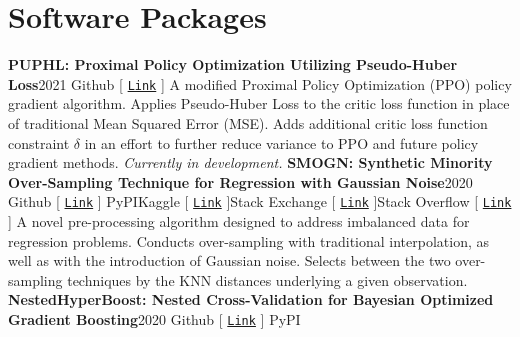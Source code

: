 \documentclass{article}
\begin{document}
    \section*{Software Packages}
        \textbf{PUPHL: Proximal Policy Optimization Utilizing Pseudo-Huber Loss}\hfill{2021}\newline
        \faGithub\space Github [ \href{https://github.com/nickkunz/puphl}{\texttt{Link}} ]\newline\newline
        A modified Proximal Policy Optimization (PPO) policy gradient algorithm. Applies Pseudo-Huber Loss to the critic loss function in place of traditional Mean Squared Error (MSE). Adds additional critic loss function constraint $\delta$ in an effort to further reduce variance to PPO and future policy gradient methods. \textit{Currently in development.}\newline\newline
        \textbf{SMOGN: Synthetic Minority Over-Sampling Technique for Regression with Gaussian Noise}\hfill{2020}\newline
        \faGithub\space Github [ \href{https://github.com/nickkunz/smogn}{\texttt{Link}} ] \space\faPython\space PyPI\space\faUsers\space Kaggle [ \href{https://www.kaggle.com/aleksandradeis/regression-addressing-extreme-rare-cases}{\texttt{Link}} ]\space\faStackExchange\space Stack Exchange [ \href{https://datascience.stackexchange.com/questions/39232/how-to-make-multiple-regression-perform-better-for-outliers-without-reducing-e/64933#64933}{\texttt{Link}} ]\space\faStackOverflow\space Stack Overflow [ \href{https://stats.stackexchange.com/questions/432185/oversampling-methods-for-numerical-data-regression/434216#434216}{\texttt{Link}} ]\newline\newline
        A novel pre-processing algorithm designed to address imbalanced data for regression problems. Conducts over-sampling with traditional interpolation, as well as with the introduction of Gaussian noise. Selects between the two over-sampling techniques by the KNN distances underlying a given observation.\newline\newline
        \textbf{NestedHyperBoost: Nested Cross-Validation for Bayesian Optimized Gradient Boosting}\hfill{2020}\newline
        \faGithub\space Github [ \href{https://github.com/nickkunz/nestedhyperboost}{\texttt{Link}} ] \space\faPython\space PyPI\newline\newline
\end{document}
